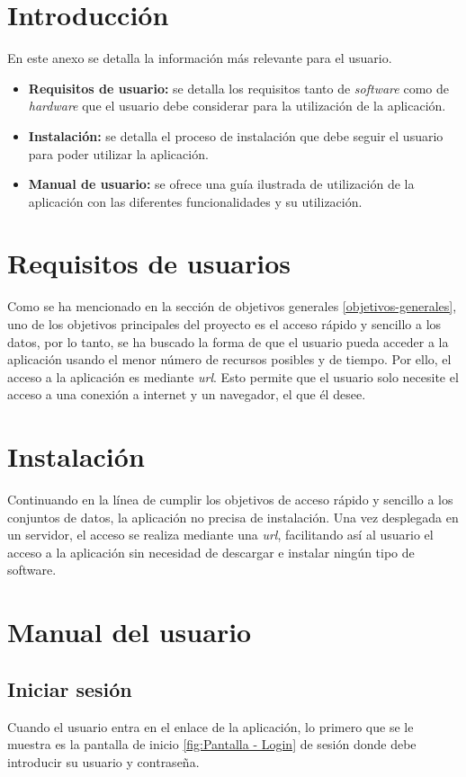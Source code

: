 
\section{Introducción}
En este anexo se detalla la información más relevante para el usuario.
\begin{itemize}
    \item \textbf{Requisitos de usuario:} se detalla los requisitos tanto de \textit{software} como de \textit{hardware} que el usuario debe considerar para la utilización de la aplicación.
    \item \textbf{Instalación:} se detalla el proceso de instalación que debe seguir el usuario para poder utilizar la aplicación.
    \item \textbf{Manual de usuario:} se ofrece una guía ilustrada de utilización de la aplicación con las diferentes funcionalidades y su utilización.
\end{itemize}

\section{Requisitos de usuarios}
Como se ha mencionado en la sección de objetivos generales \ref{objetivos-generales}, uno de los objetivos principales del proyecto es el acceso rápido y sencillo a los datos, por lo tanto, se ha buscado la forma de que el usuario pueda acceder a la aplicación usando el menor número de recursos posibles y de tiempo. Por ello, el acceso a la aplicación es mediante \textit{url}.
Esto permite que el usuario solo necesite el acceso a una conexión a internet y un navegador, el que él desee.

\section{Instalación}
Continuando en la línea de cumplir los objetivos de acceso rápido y sencillo a los conjuntos de datos, la aplicación no precisa de instalación. Una vez desplegada en un servidor, el acceso se realiza mediante una \textit{url}, facilitando así al usuario el acceso a la aplicación sin necesidad de descargar e instalar ningún tipo de software.


\section{Manual del usuario}

\subsection{Iniciar sesión}\label{inicio-sesión}
Cuando el usuario entra en el enlace de la aplicación, lo primero que se le muestra es la pantalla de inicio \ref{fig:Pantalla - Login} de sesión donde debe introducir su usuario y contraseña.

